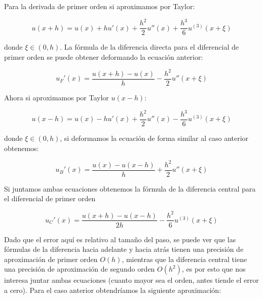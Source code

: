 \documentclass{article}
\begin{document}
	Para la derivada de primer orden si aproximamos por Taylor:
	
	\begin{equation*}
		u(x+h)=u(x) + hu'(x)+ \frac{h^2}{2}  u''(x)+ \frac{h^3}{6} u^{(3)}(x+\xi) 
	\end{equation*}
	
	donde $\xi\in (0,h)$. La fórmula de la diferencia directa para el diferencial de primer orden se puede obtener deformando la ecuación anterior:
	
	\begin{equation}
		u_F'(x)=\frac{u(x+h)-u(x)}{h} - \frac{h^2}{2}u''(x+\xi)
	\end{equation}

	Ahora si aproximamos por Taylor $u(x-h)$:

	\begin{equation*}
		u(x-h)=u(x) - hu'(x)+ \frac{h^2}{2}  u''(x) - \frac{h^3}{6} u^{(3)}(x+\xi)
	\end{equation*}
	
	donde $\xi\in (0,h)$, si deformamos la ecuación de forma similar al caso anterior obtenemos:

	\begin{equation}
		u_B'(x)=\frac{u(x)-u(x-h)}{h} + \frac{h^2}{2}u''(x+\xi)
	\end{equation}
	
	Si juntamos ambas ecuaciones obtenemos la fórmula de la diferencia central para el diferencial de primer orden

	\begin{equation}
		u_C'(x)=\frac{u(x+h)-u(x-h)}{2h} - \frac{h^2}{6}u^{(3)}(x+\xi)
	\end{equation}
	
	Dado que el error aquí es relativo al tamaño del paso, se puede ver que las fórmulas de la diferencia hacia adelante y hacia atrás tienen una precisión de aproximación de primer orden $O(h)$, mientras que la diferencia central tiene una precisión de aproximación de segundo orden $O(h^2)$, es por esto que nos interesa juntar ambas ecuaciones (cuanto mayor sea el orden, antes tiende el error a cero). Para el caso anterior obtendríamos la siguiente aproximación:\\
	
\end{document}
